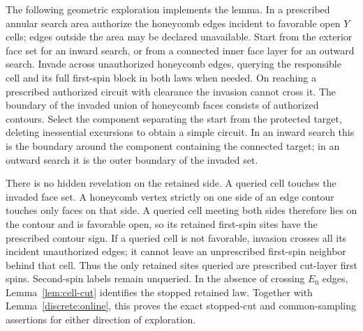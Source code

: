 The following geometric exploration implements the lemma. In a prescribed
annular search area authorize the honeycomb edges incident to favorable
open $Y$ cells; edges outside the area may be declared unavailable. Start
from the exterior face set for an inward search, or from a connected inner
face layer for an outward search. Invade across unauthorized honeycomb
edges, querying the responsible cell and its full first-spin block in both
laws when needed. On reaching a prescribed authorized circuit with
clearance the invasion cannot cross it. The boundary of the invaded union
of honeycomb faces consists of authorized contours. Select the component
separating the start from the protected target, deleting inessential
excursions to obtain a simple circuit. In an inward search this is the
boundary around the component containing the connected target; in an
outward search it is the outer boundary of the invaded set.

There is no hidden revelation on the retained side. A queried cell touches
the invaded face set. A honeycomb vertex strictly on one side of an edge
contour touches only faces on that side. A queried cell meeting both sides
therefore lies on the contour and is favorable open, so its retained
first-spin sites have the prescribed contour sign. If a queried cell is
not favorable, invasion crosses all its incident unauthorized edges; it
cannot leave an unprescribed first-spin neighbor behind that cell. Thus
the only retained sites queried are prescribed cut-layer first spins.
Second-spin labels remain unqueried. In the absence of crossing $E_0$
edges, Lemma~\ref{lem:cell-cut} identifies the stopped retained law.
Together with Lemma~\ref{discrete:online}, this proves the exact stopped-cut
and common-sampling assertions for either direction of exploration.

